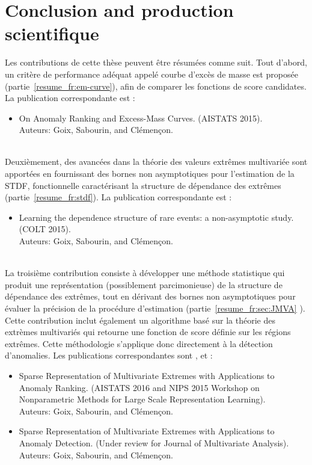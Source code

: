 \documentclass[a4paper, 12pt]{article}
\begin{document}
\section{Conclusion and production scientifique}
\label{resume_fr:intro:concl}
Les contributions de cette thèse peuvent être résumées comme suit.
%
Tout d'abord, un critère de performance adéquat appelé courbe d'excès de masse est proposée (partie~\ref{resume_fr:em-curve}), afin de comparer les fonctions de score candidates.
La publication correspondante est \cite{AISTAT15}:
%
\begin{itemize}
\item On Anomaly Ranking and Excess-Mass Curves. (AISTATS 2015).\\
Auteurs: Goix, Sabourin, and Clémençon. 
\end{itemize}

~\\
Deuxièmement, des avancées dans la théorie des valeurs extrêmes multivariée sont apportées en fournissant des bornes non asymptotiques pour l'estimation de la STDF, fonctionnelle caractérisant la structure de dépendance des extrêmes (partie~\ref{resume_fr:stdf}). La publication correspondante est \cite{COLT15}:
%
\begin{itemize}
\item Learning the dependence structure of rare events: a non-asymptotic study. (COLT 2015).\\
Auteurs: Goix, Sabourin, and Clémençon.
\end{itemize}

~\\
La troisième contribution consiste à développer une méthode statistique qui produit une représentation (possiblement parcimonieuse) de la structure de dépendance des extrêmes, tout en dérivant des bornes non asymptotiques pour évaluer la précision de la procédure d'estimation (partie~\ref{resume_fr:sec:JMVA} ).
Cette contribution inclut également un algorithme basé sur la théorie des extrèmes multivariés qui retourne une fonction de score définie sur les régions extrêmes. Cette méthodologie s'applique donc directement à la détection d'anomalies.
%
Les publications correspondantes sont \cite{AISTAT16}, \cite{NIPSWORKSHOP15} et \cite{ARXIV16}:
%
\begin{itemize}
\item Sparse Representation of Multivariate Extremes with Applications to Anomaly Ranking. (AISTATS 2016 and NIPS 2015 Workshop on Nonparametric Methods for Large Scale Representation Learning).\\
Auteurs: Goix, Sabourin, and Clémençon.
\item Sparse Representation of Multivariate Extremes with Applications to Anomaly Detection. (Under review for Journal of Multivariate Analysis).\\
Auteurs: Goix, Sabourin, and Clémençon.
\end{itemize}
\end{document}

